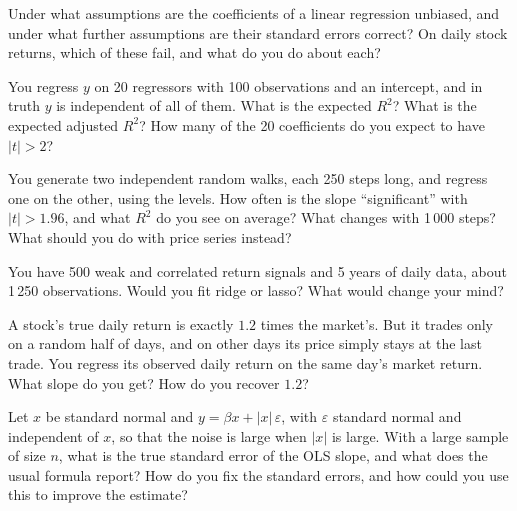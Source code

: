 \begin{question}\label{iq:iv1:regression:15}
Under what assumptions are the coefficients of a linear regression unbiased, and under what further assumptions are their standard errors correct? On daily stock returns, which of these fail, and what do you do about each?
\end{question}

\begin{question}\label{iq:iv1:regression:16}
You regress $y$ on 20 regressors with 100 observations and an intercept, and in truth $y$ is independent of all of them. What is the expected $R^2$? What is the expected adjusted $R^2$? How many of the 20 coefficients do you expect to have $|t| > 2$?
\end{question}

\begin{question}\label{iq:iv1:regression:17}
You generate two independent random walks, each 250 steps long, and regress one on the other, using the levels. How often is the slope ``significant'' with $|t| > 1.96$, and what $R^2$ do you see on average? What changes with 1\,000 steps? What should you do with price series instead?
\end{question}

\begin{question}\label{iq:iv1:regression:18}
You have 500 weak and correlated return signals and 5 years of daily data, about 1\,250 observations. Would you fit ridge or lasso? What would change your mind?
\end{question}

\begin{question}\label{iq:iv1:regression:19}
A stock's true daily return is exactly $1.2$ times the market's. But it trades only on a random half of days, and on other days its price simply stays at the last trade. You regress its observed daily return on the same day's market return. What slope do you get? How do you recover $1.2$?
\end{question}

\begin{question}\label{iq:iv1:regression:20}
Let $x$ be standard normal and $y = \beta x + |x|\,\varepsilon$, with $\varepsilon$ standard normal and independent of $x$, so that the noise is large when $|x|$ is large. With a large sample of size $n$, what is the true standard error of the OLS slope, and what does the usual formula report? How do you fix the standard errors, and how could you use this to improve the estimate?
\end{question}

